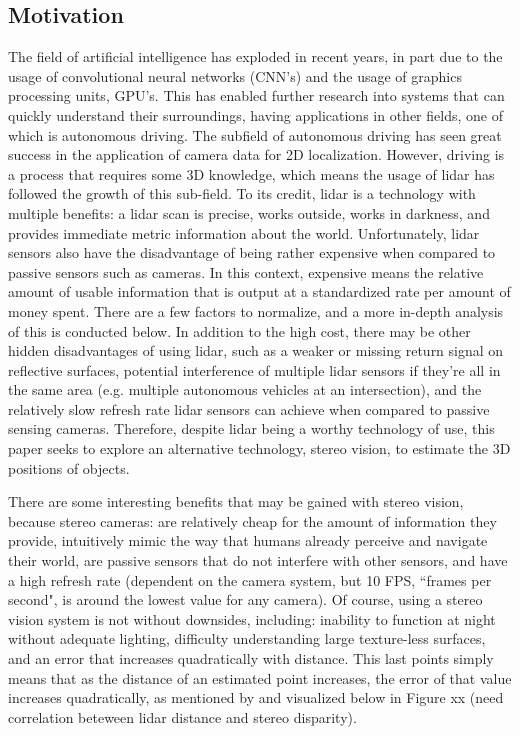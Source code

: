\subsection{Motivation}
The field of artificial intelligence has exploded in recent years, in part due to the usage of convolutional neural networks (CNN's) and the usage of graphics processing units, GPU's. This has enabled further research into systems that can quickly understand their surroundings, having applications in other fields, one of which is autonomous driving. The subfield of autonomous driving has seen great success in the application of camera data for 2D localization. However, driving is a process that requires some 3D knowledge, which means the usage of lidar has followed the growth of this sub-field. To its credit, lidar is a technology with multiple benefits: a lidar scan is precise, works outside, works in darkness, and provides immediate metric information about the world. Unfortunately, lidar sensors also have the disadvantage of being rather expensive when compared to passive sensors such as cameras. In this context, expensive means the relative amount of usable information that is output at a standardized rate per amount of money spent. There are a few factors to normalize, and a more in-depth analysis of this is conducted below. In addition to the high cost, there may be other hidden disadvantages of using lidar, such as a weaker or missing return signal on reflective surfaces, potential interference of multiple lidar sensors if they're all in the same area (e.g. multiple autonomous vehicles at an intersection), and the relatively slow refresh rate lidar sensors can achieve when compared to passive sensing cameras. Therefore, despite lidar being a worthy technology of use, this paper seeks to explore an alternative technology, stereo vision, to estimate the 3D positions of objects.

There are some interesting benefits that may be gained with stereo vision, because stereo cameras: are relatively cheap for the amount of information they provide, intuitively mimic the way that humans already perceive and navigate their world, are passive sensors that do not interfere with other sensors, and have a high refresh rate (dependent on the camera system, but 10 FPS, ``frames per second", is around the lowest value for any camera). Of course, using a stereo vision system is not without downsides, including: inability to function at night without adequate lighting, difficulty understanding large texture-less surfaces, and an error that increases quadratically with distance. This last points simply means that as the distance of an estimated point increases, the error of that value increases quadratically, as mentioned by \cite{wang_pseudo-lidar_2019} and visualized below in Figure xx (need correlation beteween lidar distance and stereo disparity).

